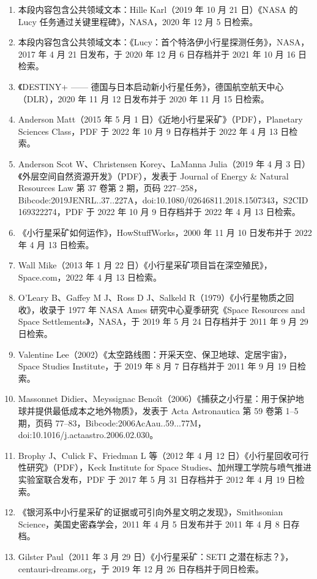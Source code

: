 \begin{enumerate}
\item 本段内容包含公共领域文本：Hille Karl（2019 年 10 月 21 日）《NASA 的 Lucy 任务通过关键里程碑》，NASA，2020 年 12 月 5 日检索。
\item 本段内容包含公共领域文本：《Lucy：首个特洛伊小行星探测任务》，NASA，2017 年 4 月 21 日发布，于 2020 年 12 月 6 日存档并于 2021 年 10 月 16 日检索。
\item 《DESTINY+ —— 德国与日本启动新小行星任务》，德国航空航天中心（DLR），2020 年 11 月 12 日发布并于 2020 年 11 月 15 日检索。
\item Anderson Matt（2015 年 5 月 1 日）《近地小行星采矿》（PDF），Planetary Sciences Class，PDF 于 2022 年 10 月 9 日存档并于 2022 年 4 月 13 日检索。
\item Anderson Scot W、Christensen Korey、LaManna Julia（2019 年 4 月 3 日）《外层空间自然资源开发》（PDF），发表于 Journal of Energy & Natural Resources Law 第 37 卷第 2 期，页码 227–258，Bibcode:2019JENRL..37..227A，doi:10.1080/02646811.2018.1507343，S2CID 169322274，PDF 于 2022 年 10 月 9 日存档并于 2022 年 4 月 13 日检索。
\item 《小行星采矿如何运作》，HowStuffWorks，2000 年 11 月 10 日发布并于 2022 年 4 月 13 日检索。
\item Wall Mike（2013 年 1 月 22 日）《小行星采矿项目旨在深空殖民》，Space.com，2022 年 4 月 13 日检索。
\item O'Leary B、Gaffey M J、Ross D J、Salkeld R（1979）《小行星物质之回收》，收录于 1977 年 NASA Ames 研究中心夏季研究《Space Resources and Space Settlements》，NASA，于 2019 年 5 月 24 日存档并于 2011 年 9 月 29 日检索。
\item Valentine Lee（2002）《太空路线图：开采天空、保卫地球、定居宇宙》，Space Studies Institute，于 2019 年 8 月 7 日存档并于 2011 年 9 月 19 日检索。
\item Massonnet Didier、Meyssignac Benoît（2006）《捕获之小行星：用于保护地球并提供最低成本之地外物质》，发表于 Acta Astronautica 第 59 卷第 1–5 期，页码 77–83，Bibcode:2006AcAau..59...77M，doi:10.1016/j.actaastro.2006.02.030。
\item Brophy J、Culick F、Friedman L 等（2012 年 4 月 12 日）《小行星回收可行性研究》（PDF），Keck Institute for Space Studies、加州理工学院与喷气推进实验室联合发布，PDF 于 2017 年 5 月 31 日存档并于 2012 年 4 月 19 日检索。
\item 《银河系中小行星采矿的证据或可引向外星文明之发现》，Smithsonian Science，美国史密森学会，2011 年 4 月 5 日发布并于 2011 年 4 月 8 日存档。
\item Gilster Paul（2011 年 3 月 29 日）《小行星采矿：SETI 之潜在标志？》，centauri-dreams.org，于 2019 年 12 月 26 日存档并于同日检索。

\end{enumerate}

